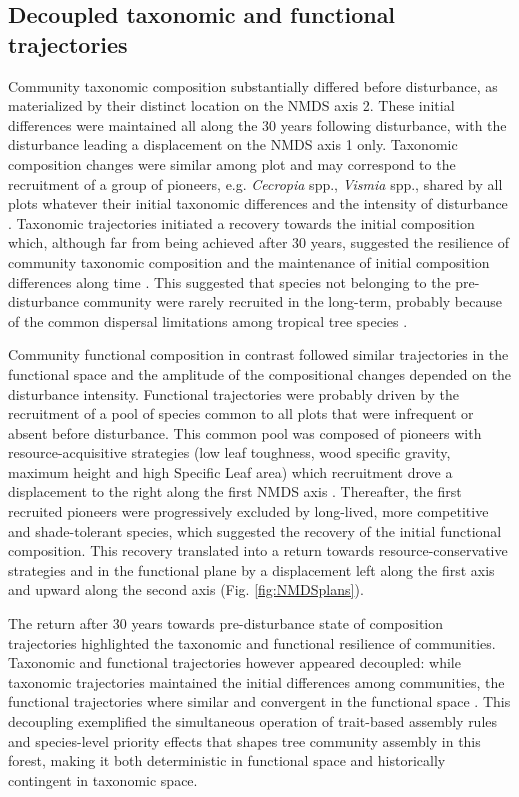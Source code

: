 \documentclass[fleqn,10pt]{ArtEcoFoG} %
\begin{document}
\subsection{Decoupled taxonomic and functional
trajectories}\label{decoupled-taxonomic-and-functional-trajectories}

Community taxonomic composition substantially differed before
disturbance, as materialized by their distinct location on the NMDS axis
2. These initial differences were maintained all along the 30 years
following disturbance, with the disturbance leading a displacement on
the NMDS axis 1 only. Taxonomic composition changes were similar among
plot and may correspond to the recruitment of a group of pioneers, e.g.
\emph{Cecropia} spp., \emph{Vismia} spp., shared by all plots whatever
their initial taxonomic differences and the intensity of disturbance
\citep{Denslow2000, Bongers2009}. Taxonomic trajectories initiated a
recovery towards the initial composition which, although far from being
achieved after 30 years, suggested the resilience of community taxonomic
composition and the maintenance of initial composition differences along
time \citep{Folke2006}. This suggested that species not belonging to the
pre-disturbance community were rarely recruited in the long-term,
probably because of the common dispersal limitations among tropical tree
species \citep{Svenning2005}.

Community functional composition in contrast followed similar
trajectories in the functional space and the amplitude of the
compositional changes depended on the disturbance intensity. Functional
trajectories were probably driven by the recruitment of a pool of
species common to all plots that were infrequent or absent before
disturbance. This common pool was composed of pioneers with
resource-acquisitive strategies (low leaf toughness, wood specific
gravity, maximum height and high Specific Leaf area) which recruitment
drove a displacement to the right along the first NMDS axis
\citep{Westoby1998, Wright2004, Reich2014}. Thereafter, the first
recruited pioneers were progressively excluded by long-lived, more
competitive and shade-tolerant species, which suggested the recovery of
the initial functional composition. This recovery translated into a
return towards resource-conservative strategies and in the functional
plane by a displacement left along the first axis and upward along the
second axis (Fig. \ref{fig:NMDSplans}).

The return after 30 years towards pre-disturbance state of composition
trajectories highlighted the taxonomic and functional resilience of
communities. Taxonomic and functional trajectories however appeared
decoupled: while taxonomic trajectories maintained the initial
differences among communities, the functional trajectories where similar
and convergent in the functional space \citep{Fukami2005}. This
decoupling exemplified the simultaneous operation of trait-based
assembly rules and species-level priority effects that shapes tree
community assembly in this forest, making it both deterministic in
functional space and historically contingent in taxonomic space.
\end{document}
